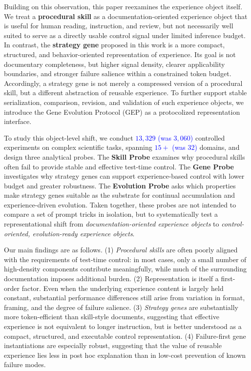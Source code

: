 \documentclass{article}
\newcommand{\blue}[1]{\textcolor{blue}{#1}}
\begin{document}
Building on this observation, this paper reexamines the experience object itself. 
We treat a \textbf{procedural skill} as a documentation-oriented experience object that is useful for human reading, instruction, and review, but not necessarily well suited to serve as a directly usable control signal under limited inference budget. 
In contrast, the \textbf{strategy gene} proposed in this work is a more compact, structured, and behavior-oriented representation of experience.
Its goal is not documentary completeness, but higher signal density, clearer applicability boundaries, and stronger failure salience within a constrained token budget. 
Accordingly, a strategy gene is not merely a compressed version of a procedural skill, but a different abstraction of reusable experience. 
To further support stable serialization, comparison, revision, and validation of such experience objects, we introduce the Gene Evolution Protocol (GEP) as a protocolized representation interface.

To study this object-level shift, we conduct \blue{$13,329$ (was $3,060$)} controlled experiments on complex scientific tasks, spanning \blue{$15+$ (was $32$)} domains, and design three analytical probes. 
The \textbf{Skill Probe} examines why procedural skills often fail to provide stable and effective test-time control. 
The \textbf{Gene Probe} investigates why strategy genes can support experience-based control with lower budget and greater robustness. 
The \textbf{Evolution Probe} asks which properties make strategy genes suitable as the substrate for continual accumulation and experience-driven evolution. 
Taken together, these probes are not intended to compare a set of prompt tricks in isolation, but to systematically test a representational shift from \emph{documentation-oriented experience objects} to \emph{control-oriented, evolution-ready experience objects}.

Our main findings are as follows.
(1) \emph{Procedural skills} are often poorly aligned with the requirements of test-time control: in most cases, only a small number of high-density components contribute meaningfully, while much of the surrounding documentation imposes additional burden.
(2) Representation is itself a first-order factor. Even when the underlying experience content is largely held constant, substantial performance differences still arise from variation in format, framing, and the degree of failure salience.
(3) \emph{Strategy genes} are substantially more token-efficient than skill-style documents, suggesting that effective experience is not equivalent to longer instruction, but is better understood as a compact, structured, and executable control representation.
(4) Failure-first gene instantiations are especially robust, suggesting that the value of reusable experience lies less in post hoc explanation than in low-cost prevention of known failure modes.
\end{document}
